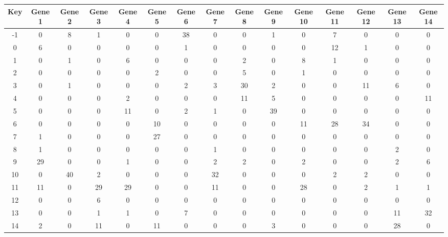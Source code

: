 \begin{tabular}{|c|c|c|c|c|c|c|c|c|c|c|c|c|c|c|}
\hline
Key & Gene 1 & Gene 2 & Gene 3 & Gene 4 & Gene 5 & Gene 6 & Gene 7 & Gene 8 & Gene 9 & Gene 10 & Gene 11 & Gene 12 & Gene 13 & Gene 14 \\
\hline
-1 & 0 & 8 & 1 & 0 & 0 & 38 & 0 & 0 & 1 & 0 & 7 & 0 & 0 & 0 \\
0 & 6 & 0 & 0 & 0 & 0 & 1 & 0 & 0 & 0 & 0 & 12 & 1 & 0 & 0 \\
1 & 0 & 1 & 0 & 6 & 0 & 0 & 0 & 2 & 0 & 8 & 1 & 0 & 0 & 0 \\
2 & 0 & 0 & 0 & 0 & 2 & 0 & 0 & 5 & 0 & 1 & 0 & 0 & 0 & 0 \\
3 & 0 & 1 & 0 & 0 & 0 & 2 & 3 & 30 & 2 & 0 & 0 & 11 & 6 & 0 \\
4 & 0 & 0 & 0 & 2 & 0 & 0 & 0 & 11 & 5 & 0 & 0 & 0 & 0 & 11 \\
5 & 0 & 0 & 0 & 11 & 0 & 2 & 1 & 0 & 39 & 0 & 0 & 0 & 0 & 0 \\
6 & 0 & 0 & 0 & 0 & 10 & 0 & 0 & 0 & 0 & 11 & 28 & 34 & 0 & 0 \\
7 & 1 & 0 & 0 & 0 & 27 & 0 & 0 & 0 & 0 & 0 & 0 & 0 & 0 & 0 \\
8 & 1 & 0 & 0 & 0 & 0 & 0 & 1 & 0 & 0 & 0 & 0 & 0 & 2 & 0 \\
9 & 29 & 0 & 0 & 1 & 0 & 0 & 2 & 2 & 0 & 2 & 0 & 0 & 2 & 6 \\
10 & 0 & 40 & 2 & 0 & 0 & 0 & 32 & 0 & 0 & 0 & 2 & 2 & 0 & 0 \\
11 & 11 & 0 & 29 & 29 & 0 & 0 & 11 & 0 & 0 & 28 & 0 & 2 & 1 & 1 \\
12 & 0 & 0 & 6 & 0 & 0 & 0 & 0 & 0 & 0 & 0 & 0 & 0 & 0 & 0 \\
13 & 0 & 0 & 1 & 1 & 0 & 7 & 0 & 0 & 0 & 0 & 0 & 0 & 11 & 32 \\
14 & 2 & 0 & 11 & 0 & 11 & 0 & 0 & 0 & 3 & 0 & 0 & 0 & 28 & 0 \\
\hline
\end{tabular}
